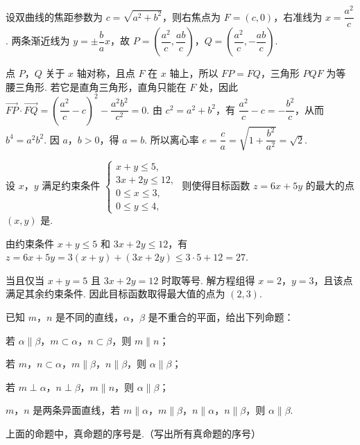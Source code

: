 \begin{solution}
设双曲线的焦距参数为 \(c=\sqrt{a^2+b^2}\)，则右焦点为 \(F=(c,0)\)，右准线为 \(x=\dfrac{a^2}{c}\). 两条渐近线为 \(y=\pm\dfrac{b}{a}x\)，故
\(P=\left(\dfrac{a^2}{c},\dfrac{ab}{c}\right)\)，\(Q=\left(\dfrac{a^2}{c},-\dfrac{ab}{c}\right)\).

点 \(P\)，\(Q\) 关于 \(x\) 轴对称，且点 \(F\) 在 \(x\) 轴上，所以 \(FP=FQ\)，三角形 \(PQF\) 为等腰三角形. 若它是直角三角形，直角只能在 \(F\) 处，因此
\(\overrightarrow{FP}\cdot\overrightarrow{FQ}=\left(\dfrac{a^2}{c}-c\right)^2-\dfrac{a^2b^2}{c^2}=0\). 由 \(c^2=a^2+b^2\)，有 \(\dfrac{a^2}{c}-c=-\dfrac{b^2}{c}\)，从而 \(b^4=a^2b^2\). 因 \(a\)，\(b>0\)，得 \(a=b\). 所以离心率
\(e=\dfrac{c}{a}=\sqrt{1+\dfrac{b^2}{a^2}}=\sqrt{2}\).
\end{solution}

\begin{problem}
设 \(x\)，\(y\) 满足约束条件 \(\begin{cases}
x+y\leqslant 5,\\
3x+2y\leqslant 12,\\
0\leqslant x\leqslant 3,\\
0\leqslant y\leqslant 4,
\end{cases}\) 则使得目标函数 \(z=6x+5y\) 的最大的点 \((x,y)\) 是\fillinblank{}.
\end{problem}

\begin{solution}
由约束条件 \(x+y\leqslant5\) 和 \(3x+2y\leqslant12\)，有
\(z=6x+5y=3(x+y)+(3x+2y)\leqslant3\cdot5+12=27\).

当且仅当 \(x+y=5\) 且 \(3x+2y=12\) 时取等号. 解方程组得 \(x=2\)，\(y=3\)，且该点满足其余约束条件. 因此目标函数取得最大值的点为 \((2,3)\).
\end{solution}

\begin{problem}
已知 \(m\)，\(n\) 是不同的直线，\(\alpha\)，\(\beta\) 是不重合的平面，给出下列命题：
\begin{circlelist}
\item 若 \(\alpha\parallel\beta\)，\(m\subset\alpha\)，\(n\subset\beta\)，则 \(m\parallel n\)；
\item 若 \(m\)，\(n\subset\alpha\)，\(m\parallel\beta\)，\(n\parallel\beta\)，则 \(\alpha\parallel\beta\)；
\item 若 \(m\perp\alpha\)，\(n\perp\beta\)，\(m\parallel n\)，则 \(\alpha\parallel\beta\)；
\item \(m\)，\(n\) 是两条异面直线，若 \(m\parallel\alpha\)，\(m\parallel\beta\)，\(n\parallel\alpha\)，\(n\parallel\beta\)，则 \(\alpha\parallel\beta\).
\end{circlelist}
上面的命题中，真命题的序号是\fillinblank{}.（写出所有真命题的序号）
\end{problem}

